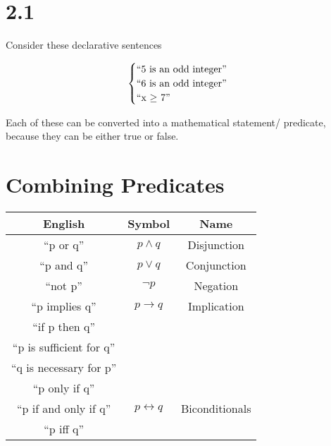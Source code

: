 \documentclass{article}
\begin{document}
\section*{2.1}

Consider these declarative sentences

\[
\begin{cases}
  $``5 is an odd integer''$ \\
  $``6 is an odd integer''$ \\
  $``x $\ge$ 7''$
\end{cases}
\]

Each of these can be converted into a mathematical statement/
predicate, because they can be either true or false.

\section*{Combining Predicates}

\begin{tabular}{|c|c|c|}
\hline
English & Symbol & Name \\
\hline
``p or q'' & $p \wedge q$ & Disjunction \\
\hline
``p and q'' & $p \vee q$ & Conjunction \\
\hline
``not p'' & $\neg p$ & Negation \\
\hline
``p implies q'' & $p \rightarrow q$ & Implication \\
``if p then q'' & &  \\
``p is sufficient for q'' & & \\
``q is necessary for p'' & & \\
``p only if q'' & & \\
\hline
``p if and only if q'' & $p \leftrightarrow q$ & Biconditionals \\
``p iff q'' & & \\
\hline
\end{tabular}
\end{document}
